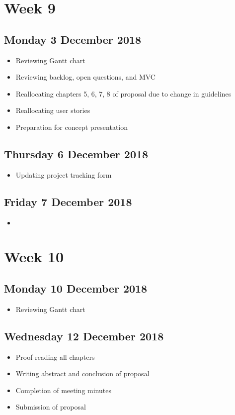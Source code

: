 \section*{Week 9}
\subsection*{Monday 3 December 2018}
\begin{itemize}
	\item Reviewing Gantt chart
	\item Reviewing backlog, open questions, and MVC
	\item Reallocating chapters 5, 6, 7, 8 of proposal due to change in guidelines
	\item Reallocating user stories
	\item Preparation for concept presentation
\end{itemize}

\subsection*{Thursday 6 December 2018}
\begin{itemize}
	\item Updating project tracking form
\end{itemize}

\subsection*{Friday 7 December 2018}
\begin{itemize}
	\item
\end{itemize}

\section*{Week 10}
\subsection*{Monday 10 December 2018}
\begin{itemize}
	\item Reviewing Gantt chart
\end{itemize}

\subsection*{Wednesday 12 December 2018}
\begin{itemize}
	\item Proof reading all chapters
	\item Writing abstract and conclusion of proposal
	\item Completion of meeting minutes
	\item Submission of proposal
\end{itemize}
